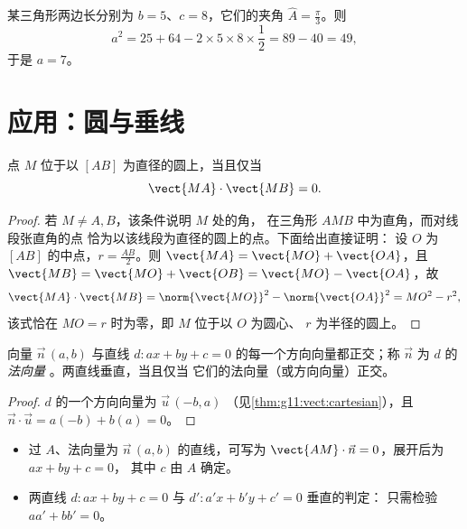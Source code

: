 \begin{example}\label{ex:g11:scal:cosines}
某三角形两边长分别为 $b = 5$、$c = 8$，它们的夹角
$\widehat A = \frac\pi3$。则
\[
a^2 = 25 + 64 - 2 \times 5 \times 8 \times \frac12 = 89 - 40 = 49,
\]
于是 $a = 7$。
\end{example}

\section{应用：圆与垂线}

\begin{proposition}[以已知线段为直径的圆]\label{prop:g11:scal:diameter}
点 $M$ 位于以 $[AB]$ 为直径的圆上，当且仅当
\[
\vect{MA} \cdot \vect{MB} = 0 .
\]
\end{proposition}

\begin{proof}
若 $M \neq A, B$，该条件说明 $M$ 处的角，
在三角形 $AMB$ 中为直角，而对线段张直角的点
恰为以该线段为直径的圆上的点。下面给出直接证明：
设 $O$ 为 $[AB]$ 的中点，$r = \frac{AB}{2}$。则
$\vect{MA} = \vect{MO} + \vect{OA}$，且
$\vect{MB} = \vect{MO} + \vect{OB} = \vect{MO} - \vect{OA}$，故
\[
\vect{MA}\cdot\vect{MB}
= \norm{\vect{MO}}^2 - \norm{\vect{OA}}^2 = MO^2 - r^2,
\]
该式恰在 $MO = r$ 时为零，即 $M$ 位于以 $O$ 为圆心、
$r$ 为半径的圆上。
\end{proof}

\begin{proposition}[直线的法向量]\label{prop:g11:scal:normal}
向量 $\vec n\,(a, b)$ 与直线
$d : ax + by + c = 0$ 的每一个方向向量都正交；称 $\vec n$ 为 $d$ 的 \emph{法向量}
。两直线垂直，当且仅当
它们的法向量（或方向向量）正交。
\end{proposition}

\begin{proof}
$d$ 的一个方向向量为 $\vec u\,(-b, a)$
（见\cref{thm:g11:vect:cartesian}），且
$\vec n \cdot \vec u = a(-b) + b(a) = 0$。
\end{proof}

\begin{method}[使用法向量]\label{met:g11:scal:normal}
\begin{itemize}
  \item 过 $A$、法向量为 $\vec n\,(a,b)$ 的直线，可写为
        $\vect{AM} \cdot \vec n = 0$，展开后为 $ax + by + c = 0$，
        其中 $c$ 由 $A$ 确定。
  \item 两直线 $d: ax+by+c = 0$ 与 $d': a'x+b'y+c' = 0$ 垂直的判定：
        只需检验 $aa' + bb' = 0$。
\end{itemize}
\end{method}

